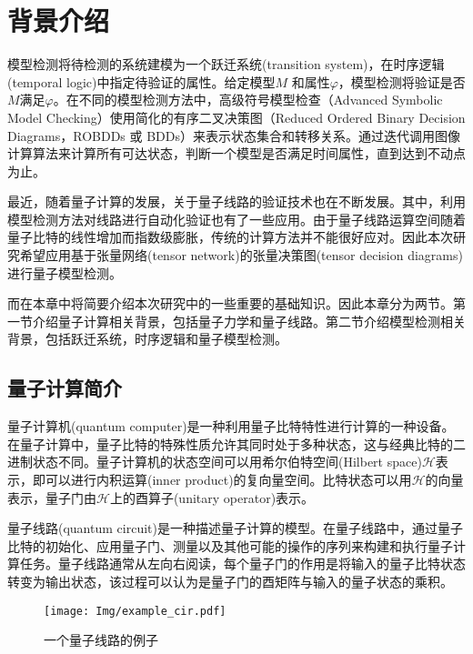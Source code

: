 \chapter{背景介绍}


模型检测将待检测的系统建模为一个跃迁系统(transition system)，在时序逻辑(temporal logic)中指定待验证的属性。给定模型\(M\) 和属性\(\varphi\)，模型检测将验证是否\(M\)满足\(\varphi\)。在不同的模型检测方法中，高级符号模型检查（Advanced Symbolic Model Checking）\citep{Grobelna_2015}使用简化的有序二叉决策图（Reduced Ordered Binary Decision Diagrams，ROBDDs 或 BDDs）\citep{Bryant_1986}来表示状态集合和转移关系。通过迭代调用图像计算算法来计算所有可达状态，判断一个模型是否满足时间属性，直到达到不动点为止。

最近，随着量子计算的发展，关于量子线路的验证技术也在不断发展\citep{viamontes2007checking,burgholzer2020advanced}。其中，利用模型检测方法对线路进行自动化验证也有了一些应用。由于量子线路运算空间随着量子比特的线性增加而指数级膨胀，传统的计算方法并不能很好应对。因此本次研究希望应用基于张量网络(tensor network)的张量决策图(tensor decision diagrams)进行量子模型检测。

而在本章中将简要介绍本次研究中的一些重要的基础知识。因此本章分为两节。第一节介绍量子计算相关背景，包括量子力学和量子线路。第二节介绍模型检测相关背景，包括跃迁系统，时序逻辑和量子模型检测。
\section{量子计算简介}
量子计算机(quantum computer)是一种利用量子比特特性进行计算的一种设备。在量子计算中，量子比特的特殊性质允许其同时处于多种状态，这与经典比特的二进制状态不同。量子计算机的状态空间可以用希尔伯特空间(Hilbert space)\(\mathcal{H}\)表示\citep{nielsen2010quantum}，即可以进行内积运算(inner product)的复向量空间。比特状态可以用\(\mathcal{H}\)的向量表示，量子门由\(\mathcal{H}\)上的酉算子(unitary operator)表示。

量子线路(quantum circuit)是一种描述量子计算的模型。在量子线路中，通过量子比特的初始化、应用量子门、测量以及其他可能的操作的序列来构建和执行量子计算任务。量子线路通常从左向右阅读，每个量子门的作用是将输入的量子比特状态转变为输出状态，该过程可以认为是量子门的酉矩阵与输入的量子状态的乘积。
\begin{figure}[!htbp]
    \centering
    \texttt{[image: Img/example\_cir.pdf]}
    \caption{一个量子线路的例子}
    \label{fig:example_cir}
\end{figure}

